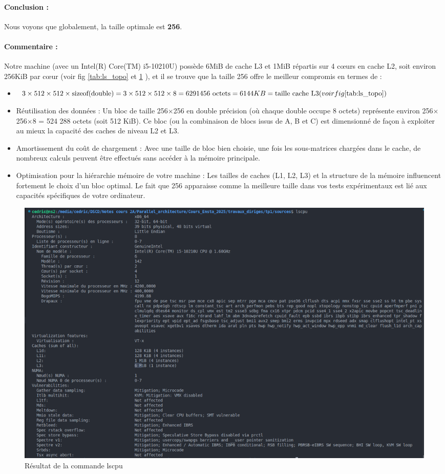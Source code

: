 \documentclass[a4paper,13pt]{book}
\begin{document}
\paragraph{Conclusion : }Nous voyons que globalement, la taille optimale est \textbf{256}.
\paragraph{Commentaire : }
Notre machine (avec un Intel(R) Core(TM) i5-10210U) possède 6MiB de cache L3 et 1MiB répartis sur 4 cœurs en cache L2, soit environ 256KiB par cœur (voir fig \ref{tab:ls_topo} et \ref{tab:lscpu} ), et il se trouve que la taille 256 offre le meilleur compromis en termes de :
\begin{itemize}
    \item $3\times 512 \times 512 \times \text{sizeof(double)} = 3 \times 512 \times 512 \times 8 = 6291456\text{ octets} = 6144 KB = \text{taille cache L3} (voir fig \ref{tab:ls_topo})$
    \item Réutilisation des données : Un bloc de taille 256$\times$256 en double précision (où chaque double occupe 8 octets) représente environ 256$\times$256$\times$8 = 524 288 octets (soit 512 KiB). Ce bloc (ou la combinaison de blocs issus de A, B et C) est dimensionné de façon à exploiter au mieux la capacité des caches de niveau L2 et L3.
    \item Amortissement du coût de chargement : Avec une taille de bloc bien choisie, une fois les sous-matrices chargées dans le cache, de nombreux calculs peuvent être effectués sans accéder à la mémoire principale.
    \item Optimisation pour la hiérarchie mémoire de votre machine : Les tailles de caches (L1, L2, L3) et la structure de la mémoire influencent fortement le choix d’un bloc optimal. Le fait que 256 apparaisse comme la meilleure taille dans vos tests expérimentaux est lié aux capacités spécifiques de votre ordinateur.
\end{itemize}

\begin{figure}[!h]
    \begin{center}
    \includegraphics[scale=0.5]{images/lscpu.png}
    \caption{Résultat de la commande lscpu}
    \label{tab:lscpu}
\end{center}
\end{figure}
\end{document}
